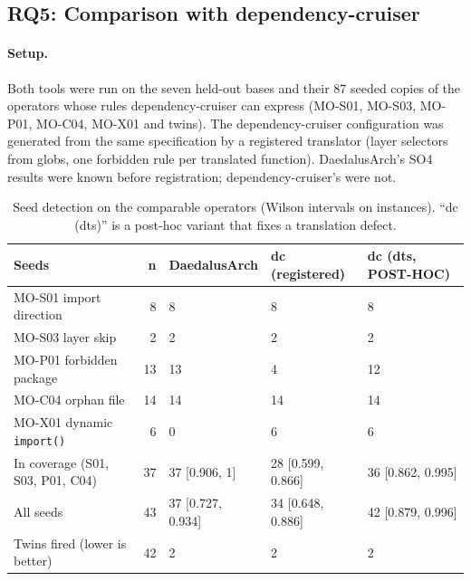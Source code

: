 \documentclass[10pt,a4paper]{article}
\newcommand{\tool}{DaedalusArch}
\newcommand{\dc}{dependency-cruiser}
\begin{document}
\subsection{RQ5: Comparison with dependency-cruiser}\label{sec:rq5}

\paragraph{Setup.}
Both tools were run on the seven held-out bases and their 87 seeded copies of the operators whose rules \dc{} can
express (MO-S01, MO-S03, MO-P01, MO-C04, MO-X01 and twins). The \dc{} configuration was generated from the same
specification by a registered translator (layer selectors from globs, one forbidden rule per translated function).
\tool{}'s SO4 results were known before registration; \dc{}'s were not. %

\begin{table}[t]
\centering
\caption{Seed detection on the comparable operators (Wilson intervals on instances). ``dc (dts)'' is a post-hoc
variant that fixes a translation defect.}
\label{tab:dc}
\small
\begin{tabular}{@{}lrlll@{}}
\toprule
Seeds & n & \tool{} & dc (registered) & dc (dts, POST-HOC) \\
\midrule
MO-S01 import direction & 8 & 8 & 8 & 8 \\
MO-S03 layer skip & 2 & 2 & 2 & 2 \\
MO-P01 forbidden package & 13 & 13 & 4 & 12 \\
MO-C04 orphan file & 14 & 14 & 14 & 14 \\
MO-X01 dynamic \texttt{import()} & 6 & 0 & 6 & 6 \\
\midrule
In coverage (S01, S03, P01, C04) & 37 & 37 [0.906, 1] & 28 [0.599, 0.866] & 36 [0.862, 0.995] \\
All seeds & 43 & 37 [0.727, 0.934] & 34 [0.648, 0.886] & 42 [0.879, 0.996] \\
Twins fired (lower is better) & 42 & 2 & 2 & 2 \\
\bottomrule
\end{tabular}
\end{table}
\end{document}
